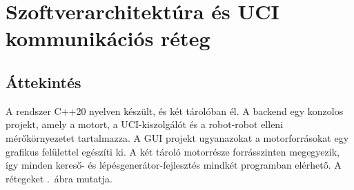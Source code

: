 \chapter{Szoftverarchitektúra és UCI kommunikációs réteg}\label{chap:architecture}

\section{Áttekintés}

A rendszer C++20 nyelven készült, és két tárolóban él. A backend egy konzolos projekt, amely a motort, a UCI-kiszolgálót és a robot-robot elleni mérőkörnyezetet tartalmazza. A GUI projekt ugyanazokat a motorforrásokat egy grafikus felülettel egészíti ki. A két tároló motorrésze forrásszinten megegyezik, így minden kereső- és lépésgenerátor-fejlesztés mindkét programban elérhető. A rétegeket .~ábra mutatja.

